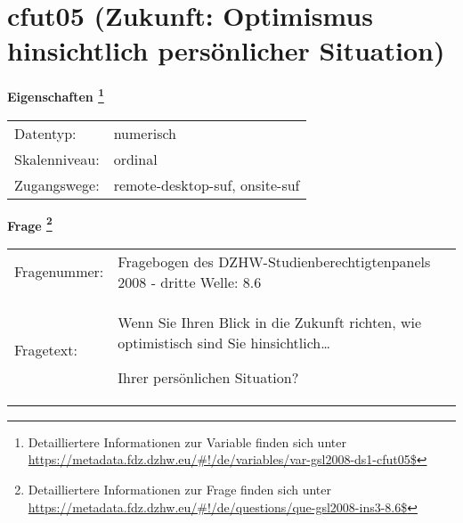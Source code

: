 
    \setcounter{footnote}{0}

    \vspace*{-1.8cm}
	\section{cfut05 (Zukunft: Optimismus hinsichtlich persönlicher Situation)}
	\label{section:cfut05}



    \vspace*{0.5cm}
    \noindent\textbf{Eigenschaften
	\footnote{Detailliertere Informationen zur Variable finden sich unter
		\url{https://metadata.fdz.dzhw.eu/\#!/de/variables/var-gsl2008-ds1-cfut05$}}}\\
	\begin{tabularx}{\hsize}{@{}lX}
	Datentyp: & numerisch \\
	Skalenniveau: & ordinal \\
	Zugangswege: &
	  remote-desktop-suf, 
	  onsite-suf
 \\
    \end{tabularx}



				\vspace*{0.5cm}
                \noindent\textbf{Frage
	                \footnote{Detailliertere Informationen zur Frage finden sich unter
		              \url{https://metadata.fdz.dzhw.eu/\#!/de/questions/que-gsl2008-ins3-8.6$}}}\\
				\begin{tabularx}{\hsize}{@{}lX}
					Fragenummer: &
					  Fragebogen des DZHW-Studienberechtigtenpanels 2008 - dritte Welle:
					  8.6
 \\
					Fragetext: & Wenn Sie Ihren Blick in die Zukunft richten, wie optimistisch sind Sie hinsichtlich…\par  Ihrer persönlichen Situation? \\
				\end{tabularx}





